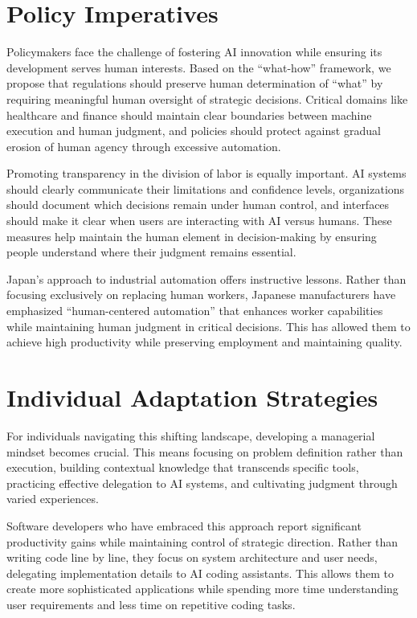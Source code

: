 \documentclass[
  Letterpaper,
]{scrbook}
\begin{document}
\section{Policy Imperatives}\label{policy-imperatives}

Policymakers face the challenge of fostering AI innovation while
ensuring its development serves human interests. Based on the
``what-how'' framework, we propose that regulations should preserve
human determination of ``what'' by requiring meaningful human oversight
of strategic decisions. Critical domains like healthcare and finance
should maintain clear boundaries between machine execution and human
judgment, and policies should protect against gradual erosion of human
agency through excessive automation.

Promoting transparency in the
division of labor is equally important. AI systems should clearly
communicate their limitations and confidence levels, organizations
should document which decisions remain under human control, and
interfaces should make it clear when users are interacting with AI
versus humans. These measures help maintain the human element in
decision-making by ensuring people
understand where their judgment remains essential.

Japan's approach to industrial automation offers instructive lessons.
Rather than focusing exclusively on replacing human workers, Japanese
manufacturers have emphasized ``human-centered automation'' that
enhances worker capabilities while maintaining human judgment in
critical decisions. This has allowed them to achieve high productivity
while preserving employment and maintaining quality.

\section{Individual Adaptation
Strategies}\label{individual-adaptation-strategies}

For individuals navigating this shifting landscape, developing a
managerial mindset becomes crucial. This means focusing on problem
definition rather than execution, building contextual knowledge that
transcends specific tools, practicing effective delegation to AI
systems, and cultivating judgment through varied experiences.

Software developers who have embraced this approach report significant
productivity gains while maintaining control of strategic direction.
Rather than writing code line by line, they focus on system architecture
and user needs, delegating implementation details to AI coding
assistants. This allows them to create more sophisticated applications
while spending more time understanding user requirements and less time
on repetitive coding tasks.
\end{document}
